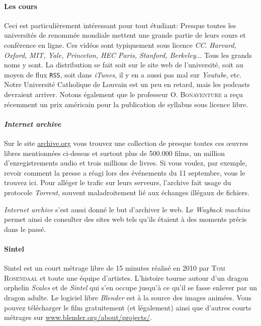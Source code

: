 \documentclass[10pt]{../fiche}
\begin{document}
\paragraph{Les cours}
Ceci est particulièrement intéressant pour tout étudiant: Presque toutes les universités de renommée mondiale mettent une grande partie de leurs cours et conférence en ligne.
Ces vidéos sont typiquement sous licence \textit{CC}. \textit{Harvard, Oxford, MIT, Yale, Princeton, HEC Paris, Stanford, Berkeley}... Tous les grands noms y sont.
La distribution se fait soit sur le site web de l'université, soit au moyen de flux \texttt{RSS}, soit dans \textit{iTunes}, il y en a aussi pas mal sur \textit{Youtube}, etc.
Notre Université Catholique de Louvain est un peu en retard, mais les podcasts devraient arriver.
Notons également que le professeur O. \textsc{Bonaventure} a reçu récemment un prix américain pour la publication de syllabus sous licence libre. %

\paragraph{\textit{Internet archive}}
Sur le site \url{archive.org} vous trouvez une collection de presque toutes ces \oe uvres libres mentionnées ci-dessus et surtout plus de 500.000 films, un million d’enregistrements audio et trois millions de livres.
Si vous voulez, par exemple, revoir comment la presse a réagi lors des événements du 11 septembre, vous le trouvez ici.
Pour alléger le trafic sur leurs serveurs, l'archive fait usage du protocole \textit{Torrent}, souvent maladroitement lié aux échanges illégaux de fichiers.

\textit{Internet archive} s'est aussi donné le but d'archiver le web. Le \textit{Wayback machine} permet ainsi de consulter des sites web tels qu'ils étaient à des moments précis dans le passé.

\paragraph{Sintel}
Sintel est un court métrage libre de 15 minutes réalisé en 2010 par \textsc{Tom Rosendaal} et toute une équipe d'artistes.
L'histoire tourne autour d'un dragon orphelin \textit{Scales} et de \textit{Sintel} qui s'en occupe jusqu'à ce qu'il se fasse enlever par un dragon adulte.
Le logiciel libre \textit{Blender} est à la source des images animées.
Vous pouvez télécharger le film gratuitement (et légalement) ainsi que d'autres courts métrages sur \url{www.blender.org/about/projects/}.
\end{document}
